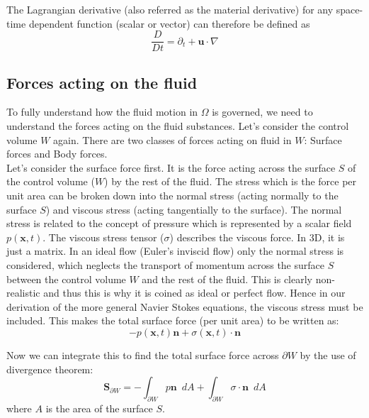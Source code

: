 The Lagrangian derivative (also referred as the material derivative) for any space-time dependent function (scalar or vector) can therefore be defined as \cite{chorin1968numerical}
\begin{equation}
\dfrac{D}{D t} = \partial_t + \textbf{u} \cdot \nabla
\end{equation}

\subsection{Forces acting on the fluid}
To fully understand how the fluid motion in $\Omega$ is governed, we need to understand the forces acting on the fluid substances. Let's consider the control volume $W$ again. There are two classes of forces acting on fluid in $W$: Surface forces and Body forces.\\

Let's consider the surface force first. It is the force acting across the surface $S$ of the control volume ($W$) by the rest of the fluid. The stress which is the force per unit area can be broken down into the normal stress (acting normally to the surface $S$) and viscous stress (acting tangentially to the surface). The normal stress is related to the concept of pressure which is represented by a scalar field $p(\textbf{x},t)$. The viscous stress tensor ($\textbf{$\sigma$}$) describes the viscous force. In 3D, it is just a matrix. In an ideal flow (Euler's inviscid flow) only the normal stress is considered, which neglects the transport of momentum across the surface $S$ between the control volume $W$ and the rest of the fluid. This is clearly non-realistic and thus this is why it is coined as ideal or perfect flow. Hence in our derivation of the more general Navier Stokes equations, the viscous stress must be included. This makes the total surface force (per unit area) to be written as:
\begin{equation}
- p(\textbf{x},t) \textbf{n} + \textbf{$\sigma$} (\textbf{x},t)\cdot \textbf{n}
\end{equation}

Now we can integrate this to find the total surface force across $\partial W$ by the use of divergence theorem:
\begin{equation}
\textbf{S}_{\partial W} = - \int_{\partial W} p \textbf{n}\,\,\,dA + \int_{\partial W} \textbf{$\sigma$}\cdot\textbf{n}\, \, \, dA
\end{equation}
where $A$ is the area of the surface $S$.

